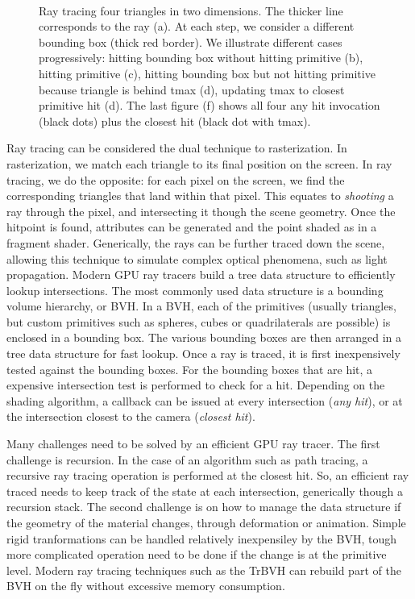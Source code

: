 \begin{figure}
\centering
   \def\svgwidth{\textwidth}
    \\
\caption{Ray tracing four triangles in two dimensions. The thicker line corresponds to the ray (a). At each step, we consider a different bounding box (thick red border). We illustrate different cases progressively: hitting bounding box without hitting primitive (b), hitting primitive (c), hitting bounding box but not hitting primitive because triangle is behind tmax (d), updating tmax to closest primitive hit (d). The last figure (f) shows all four any hit invocation (black dots) plus the closest hit (black dot with tmax).} 
\label{fig:ray_tracing}
\end{figure}

Ray tracing can be considered the dual technique to rasterization. In rasterization, we match each triangle to its final position on the screen. In ray tracing, we do the opposite: for each pixel on the screen, we find the corresponding triangles that land within that pixel. This equates to \emph{shooting} a ray through the pixel, and intersecting it though the scene geometry. Once the hitpoint is found, attributes can be generated and the point shaded as in a fragment shader. Generically, the rays can be further traced down the scene, allowing this technique to simulate complex optical phenomena, such as light propagation. 
Modern GPU ray tracers build a tree data structure to efficiently lookup intersections. The most commonly used data structure is a bounding volume hierarchy, or BVH. In a BVH, each of the primitives (usually triangles, but custom primitives such as spheres, cubes or quadrilaterals are possible) is enclosed in a bounding box. The various bounding boxes are then arranged in a tree data structure for fast lookup. Once a ray is traced, it is first inexpensively tested against the bounding boxes. For the bounding boxes that are hit, a expensive intersection test is performed to check for a hit. Depending on the shading algorithm, a callback can be issued at every intersection (\emph{any hit}), or at the intersection closest to the camera (\emph{closest hit}). 

Many challenges need to be solved by an efficient GPU ray tracer. The first challenge is recursion. In the case of an algorithm such as path tracing, a recursive ray tracing operation is performed at the closest hit. So, an efficient ray traced needs to keep track of the state at each intersection, generically though a recursion stack. The second challenge is on how to manage the data structure if the geometry of the material changes, through deformation or animation. Simple rigid tranformations can be handled relatively inexpensiley by the BVH, tough more complicated operation need to be done if the change is at the primitive level. Modern ray tracing techniques such as the TrBVH can rebuild part of the BVH on the fly without excessive memory consumption. 

